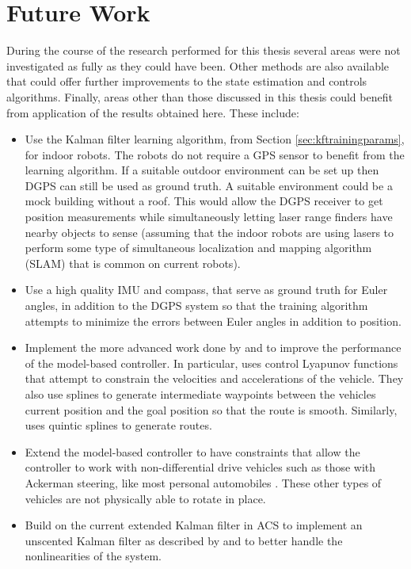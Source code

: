 \section{Future Work}
\label{sec:futureWork}
During the course of the research performed for this thesis several areas were not investigated as fully as they could have been. Other methods are also available that could offer further improvements to the state estimation and controls algorithms. Finally, areas other than those discussed in this thesis could benefit from application of the results obtained here. These include:
\begin{itemize}
\item Use the Kalman filter learning algorithm, from Section \ref{sec:kftrainingparams}, for indoor robots. The robots do not require a GPS sensor to benefit from the learning algorithm. If a suitable outdoor environment can be set up then DGPS can still be used as ground truth. A suitable environment could be a mock building without a roof. This would allow the DGPS receiver to get position measurements while simultaneously letting laser range finders have nearby objects to sense (assuming that the indoor robots are using lasers to perform some type of simultaneous localization and mapping algorithm (SLAM) that is common on current robots).
\item Use a high quality IMU and compass, that serve as ground truth for Euler angles, in addition to the DGPS system so that the training algorithm attempts to minimize the errors between Euler angles in addition to position.
\item Implement the more advanced work done by \cite{Lapierre06} and \cite{Gulati08} to improve the performance of the model-based controller. In particular, \cite{Gulati08} uses control Lyapunov functions that attempt to constrain the velocities and accelerations of the vehicle. They also use splines to generate intermediate waypoints between the vehicles current position and the goal position so that the route is smooth. Similarly, \cite{Burgard09} uses quintic splines to generate routes.
\item Extend the model-based controller to have constraints that allow the controller to work with non-differential drive vehicles such as those with Ackerman steering, like most personal automobiles \cite{Shiller91dynamicmotion}. These other types of vehicles are not physically able to rotate in place.
\item Build on the current extended Kalman filter in ACS to implement an unscented Kalman filter as described by \cite{ThrunProbRobots06} and \cite{Orderud05} to better handle the nonlinearities of the system.

\end{itemize}
